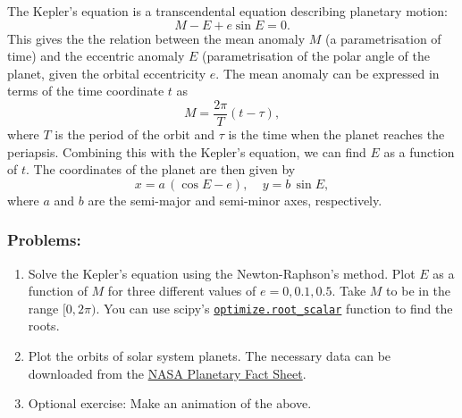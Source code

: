 
The Kepler's equation is a  transcendental equation describing planetary motion:
\begin{equation}
M - E + e \sin E = 0. 
\label{eq:keplers_eqn}
\end{equation}
This gives the the relation between the mean anomaly $M$ (a parametrisation of time) and the eccentric anomaly $E$ (parametrisation of the polar angle of the planet, given the orbital eccentricity $e$. The mean anomaly can be expressed in terms of the time coordinate $t$ as 
\begin{equation}
M = \frac{2\pi}{T} (t - \tau), 
\label{eq:mean_anomaly}
\end{equation}
where $T$ is the period of the orbit and $\tau$ is the time when the planet reaches the periapsis. Combining this with the Kepler's equation, we can find $E$ as a function of $t$. The coordinates of the planet are then given by 
\begin{equation}
x = a  \, (\cos E - e), ~~~~~ y = b \, \sin E, 
\end{equation}
where $a$ and $b$ are the semi-major and semi-minor axes, respectively. 

\subsubsection{Problems:}
\begin{enumerate}
\item Solve the Kepler's equation using the Newton-Raphson's method. Plot $E$ as a function of $M$ for three different values of $e = 0, 0.1, 0.5$. Take $M$ to be in the range $[0, 2 \pi)$. You can use scipy's \href{https://docs.scipy.org/doc/scipy/reference/generated/scipy.optimize.root_scalar.html#scipy.optimize.root_scalar}{\texttt{optimize.root\_scalar}} function to find the roots. 
\item Plot the orbits of solar system planets. The necessary data can be downloaded from the \href{https://nssdc.gsfc.nasa.gov/planetary/factsheet/}{NASA Planetary Fact Sheet}.  
\item Optional exercise: Make an animation of the above. 
\end{enumerate}

